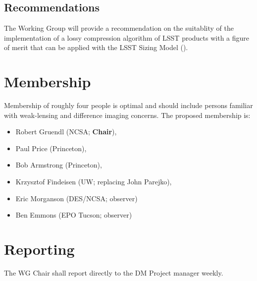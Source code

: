 \subsection{Recommendations}

The Working Group will provide a recommendation on the suitablity of the implementation
of a lossy compression algorithm of LSST products with a figure of merit that can be 
applied with the LSST Sizing Model ().


\section{Membership}

Membership of roughly four people is optimal and should include persons familiar 
with weak-lensing and difference imaging concerns.
The proposed membership is:

\begin{itemize}
    \item Robert Gruendl (NCSA; \textbf{Chair}),
    \item Paul Price (Princeton),
    \item Bob Armstrong (Princeton),
    \item Krzysztof Findeisen (UW; replacing John Parejko),
    \item Eric Morganson (DES/NCSA; observer)
    \item Ben Emmons (EPO Tucson; observer)
\end{itemize}


\section{Reporting}

The WG Chair shall report directly to the DM Project manager weekly.
